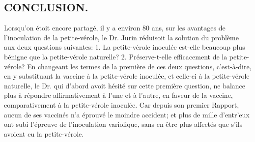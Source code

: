 \subsection{CONCLUSION.}
Lorsqu'on étoit encore partagé, il y a environ 80 ans, sur les avantages de l'inoculation de la petite-vérole, le Dr. Jurin réduisoit la solution du problème aux deux questions suivantes: 1. La petite-vérole inoculée est-elle beaucoup plus bénigne que la petite-vérole naturelle? 2. Préserve-t-elle efficacement de la petite-vérole?
En changeant les termes de la première de ces deux questions, c'est-à-dire, en y substituant la vaccine à la petite-vérole inoculée, et celle-ci à la petite-vérole naturelle, le Dr. qui d'abord avoit hésité sur cette première question, ne balance plus à répondre affirmativement à l'une et à l'autre, en faveur de la vaccine, comparativement à la petite-vérole inoculée. Car depuis son premier\setcounter{page}{373} Rapport, aucun de ses vaccinés n'a éprouvé le moindre accident; et plus de mille d'entr'eux ont subi l'épreuve de l'inoculation variolique, sans en être plus affectés que s'ils avoient eu la petite-vérole.

